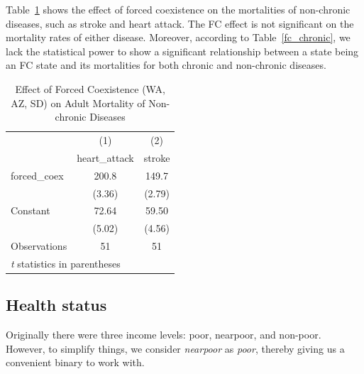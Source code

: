\documentclass[12pt]{article}
\begin{document}
Table~\ref{fc2} shows the effect of forced coexistence on the mortalities of non-chronic diseases, such as stroke and heart attack. The FC effect is not significant on the mortality rates of either disease.
Moreover, according to Table~\ref{fc_chronic}, we lack the statistical power to show a significant relationship between a state being an FC state and its mortalities for both chronic and non-chronic diseases.

\begin{table}[htbp]\centering \caption{Effect of Forced Coexistence (WA, AZ, SD) on Adult Mortality of Non-chronic Diseases\label{fc2}} \begin{tabular}{l*{2}{c}} \toprule
                    &\multicolumn{1}{c}{(1)}&\multicolumn{1}{c}{(2)}\\
                    &\multicolumn{1}{c}{heart\_attack}&\multicolumn{1}{c}{stroke}\\
\midrule
forced\_coex         &       200.8&       149.7\\
                    &      (3.36)&      (2.79)\\
\addlinespace
Constant            &       72.64&       59.50\\
                    &      (5.02)&      (4.56)\\
\midrule
Observations        &          51&          51\\
\bottomrule
\multicolumn{3}{l}{\footnotesize \textit{t} statistics in parentheses}\\
\end{tabular}
\end{table}






\subsection{Health status}
Originally there were three income levels: poor, nearpoor, and non-poor.
However, to simplify things, we consider \emph{nearpoor} as \emph{poor}, thereby giving us a convenient binary to work with.
\end{document}
